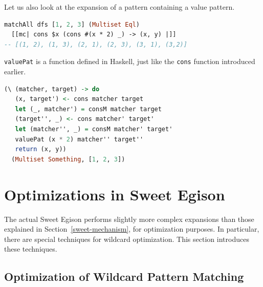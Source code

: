 Let us also look at the expansion of a pattern containing a value pattern.
\begin{lstlisting}[language=haskell,numbers=none]
matchAll dfs [1, 2, 3] (Multiset Eql)
  [[mc| cons $x (cons #(x * 2) _) -> (x, y) |]]
-- [(1, 2), (1, 3), (2, 1), (2, 3), (3, 1), (3,2)]
\end{lstlisting}
\lstinline{valuePat} is a function defined in Haskell, just like the \lstinline{cons} function introduced earlier.
\begin{lstlisting}[language=haskell,numbers=none]
(\ (matcher, target) -> do
   (x, target') <- cons matcher target
   let (_, matcher') = consM matcher target
   (target'', _) <- cons matcher' target'
   let (matcher'', _) = consM matcher' target'
   valuePat (x * 2) matcher'' target''
   return (x, y))
  (Multiset Something, [1, 2, 3])
\end{lstlisting}

\section{Optimizations in Sweet Egison}\label{sweet-optimize}

The actual Sweet Egison performs slightly more complex expansions than those explained in Section~\ref{sweet-mechanism}, for optimization purposes.
In particular, there are special techniques for wildcard optimization.
This section introduces these techniques.

\subsection{Optimization of Wildcard Pattern Matching}

